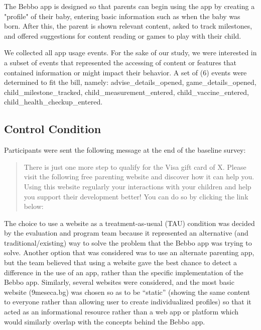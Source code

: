 \documentclass{article}
\begin{document}
The Bebbo app is designed so that parents can begin using the app by creating a "profile" of their baby, entering basic information such as when the baby was born. After this, the parent is shown relevant content, asked to track milestones, and offered suggestions for content reading or games to play with their child.

We collected all app usage events. For the sake of our study, we were interested in a subset of events that represented the accessing of content or features that contained information or might impact their behavior. A set of (6) events were determined to fit the bill, namely: advise\_details\_opened, game\_details\_opened, child\_milestone\_tracked, child\_measurement\_entered, child\_vaccine\_entered, child\_health\_checkup\_entered.


\subsection*{Control Condition}

Participants were sent the following message at the end of the baseline survey:

\begin{quote}

There is just one more step to qualify for the Visa gift card of X. Please visit the following free parenting website and discover how it can help you. Using this website regularly  your interactions with your children and help you support their development better! You can do so by clicking the link below:
\end{quote}

The choice to use a website as a treatment-as-usual (TAU) condition was decided by the evaluation and program team because it represented an alternative (and traditional/existing) way to solve the problem that the Bebbo app was trying to solve. Another option that was considered was to use an alternate parenting app, but the team believed that using a website gave the best chance to detect a difference in the use of an app, rather than the specific implementation of the Bebbo app. Similarly, several websites were considered, and the most basic website (9meseca.bg) was chosen so as to be ``static'' (showing the same content to everyone rather than allowing user to create individualized profiles) so that it acted as an informational resource rather than a web app or platform which would similarly overlap with the concepts behind the Bebbo app.
\end{document}
